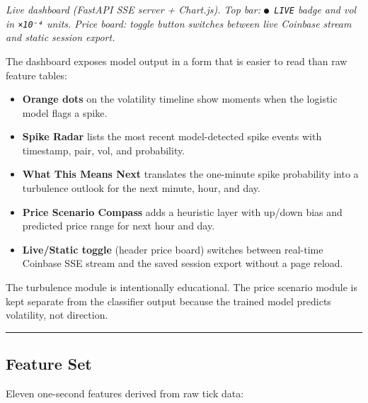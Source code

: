 \documentclass[
]{article}
\providecommand{\tightlist}{%
  \setlength{\itemsep}{0pt}\setlength{\parskip}{0pt}}
\begin{document}
\emph{Live dashboard (FastAPI SSE server + Chart.js). Top bar:
\texttt{●\ LIVE} badge and vol in \texttt{×10⁻⁴} units. Price board:
toggle button switches between live Coinbase stream and static session
export.}

The dashboard exposes model output in a form that is easier to read than
raw feature tables:

\begin{itemize}
\tightlist
\item
  \textbf{Orange dots} on the volatility timeline show moments when the
  logistic model flags a spike.
\item
  \textbf{Spike Radar} lists the most recent model-detected spike events
  with timestamp, pair, vol, and probability.
\item
  \textbf{What This Means Next} translates the one-minute spike
  probability into a turbulence outlook for the next minute, hour, and
  day.
\item
  \textbf{Price Scenario Compass} adds a heuristic layer with up/down
  bias and predicted price range for next hour and day.
\item
  \textbf{Live/Static toggle} (header price board) switches between
  real-time Coinbase SSE stream and the saved session export without a
  page reload.
\end{itemize}

The turbulence module is intentionally educational. The price scenario
module is kept separate from the classifier output because the trained
model predicts volatility, not direction.

\begin{center}\rule{0.5\linewidth}{0.5pt}\end{center}

\hypertarget{feature-set}{%
\subsection{Feature Set}\label{feature-set}}

Eleven one-second features derived from raw tick data:
\end{document}
